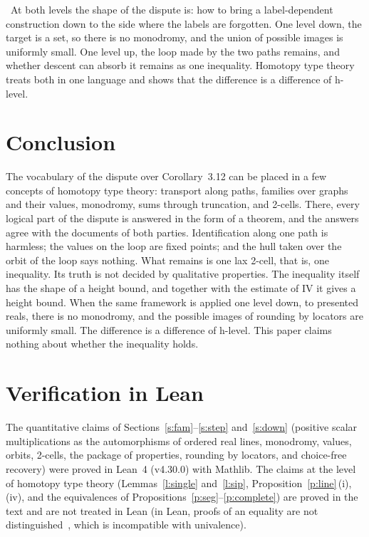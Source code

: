 \documentclass[11pt,a4paper]{article}
\newcommand{\lab}[2]{{\upshape\fcolorbox{#1}{#1!8}{\scriptsize\sffamily\bfseries\textcolor{#1}{#2}}}}
\newcommand{\tagH}{\lab{BurntOrange}{H}}
\theoremstyle{plain}
\theoremstyle{definition}
\theoremstyle{remark}
\begin{document}
\tagH\ At both levels the shape of the dispute is: how to bring a label-dependent construction down to the side where
the labels are forgotten. One level down, the target is a set, so there is no monodromy, and the union of possible images
is uniformly small. One level up, the loop made by the two paths remains, and whether descent can absorb it remains as
one inequality. Homotopy type theory treats both in one language and shows that the difference is a difference of
h-level.

\section{Conclusion}\label{s:concl}
The vocabulary of the dispute over Corollary~3.12 can be placed in a few concepts of homotopy type theory: transport
along paths, families over graphs and their values, monodromy, sums through truncation, and 2-cells. There, every
logical part of the dispute is answered in the form of a theorem, and the answers agree with the documents of both
parties. Identification along one path is harmless; the values on the loop are fixed points; and the hull taken over the
orbit of the loop says nothing. What remains is one lax 2-cell, that is, one inequality. Its truth is not decided by
qualitative properties. The inequality itself has the shape of a height bound, and together with the estimate of IV it
gives a height bound. When the same framework is applied one level down, to presented reals, there is no monodromy, and
the possible images of rounding by locators are uniformly small. The difference is a difference of h-level. This paper
claims nothing about whether the inequality holds.

\appendix
\section{Verification in Lean}\label{app:lean}
The quantitative claims of Sections~\ref{s:fam}--\ref{s:step} and~\ref{s:down} (positive scalar multiplications as the
automorphisms of ordered real lines, monodromy, values, orbits, 2-cells, the package of properties, rounding by locators,
and choice-free recovery) were proved in Lean~4 (v4.30.0) with Mathlib. The claims at the level of homotopy type theory
(Lemmas~\ref{l:single} and~\ref{l:sip}, Proposition~\ref{p:line}\,(i),\,(iv), and the equivalences of
Propositions~\ref{p:seg}--\ref{p:complete}) are proved in the text and are not treated in Lean (in Lean, proofs of an
equality are not distinguished~\cite[\S1.2]{Ca}, which is incompatible with univalence).
\end{document}
